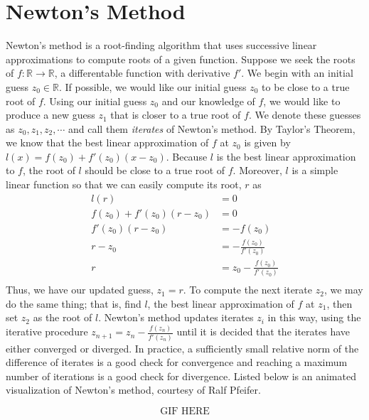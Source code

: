 \documentclass{book}
\begin{document}
\section{Newton's Method}
Newton's method is a root-finding algorithm that uses successive linear approximations to compute roots of a given function. Suppose we seek the roots of $f: \mathbb{R} \rightarrow \mathbb{R}$, a differentable function with derivative $f'$. We begin with an initial guess $z_0 \in \mathbb{R}$. If possible, we would like our initial guess $z_0$ to be close to a true root of $f$. Using our initial guess $z_0$ and our knowledge of $f$, we would like to produce a new guess $z_1$ that is closer to a true root of $f$. We denote these guesses as $z_0, z_1, z_2, \cdots$ and call them \textit{iterates} of Newton's method. By Taylor's Theorem, we know that the best linear approximation of $f$ at $z_0$ is given by $l(x) = f(z_0) + f'(z_0)(x - z_0)$. Because $l$ is the best linear approximation to $f$, the root of $l$ should be close to a true root of $f$. Moreover, $l$ is a simple linear function so that we can easily compute its root, $r$ as
\begin{align*}
l(r) &= 0 \\
f(z_0) + f'(z_0)(r - z_0) &= 0 \\
f'(z_0)(r - z_0) &= - f(z_0) \\
r - z_0 &= - \frac{f(z_0)}{f'(z_0)} \\
r &= z_0 - \frac{f(z_0)}{f'(z_0)} \\
\end{align*}
Thus, we have our updated guess, $z_1 = r$. To compute the next iterate $z_2$, we may do the same thing; that is, find $l$, the best linear approximation of $f$ at $z_1$, then set $z_2$ as the root of $l$. Newton's method updates iterates $z_i$ in this way, using the iterative procedure $z_{n+1} =  z_n - \frac{f(z_n)}{f'(z_n)}$ until it is decided that the iterates have either converged or diverged. In practice, a sufficiently small relative norm of the difference of iterates is a good check for convergence and reaching a maximum number of iterations is a good check for divergence. Listed below is an animated visualization of Newton's method, courtesy of Ralf Pfeifer.

$$ \text{GIF HERE} $$

\end{document}
